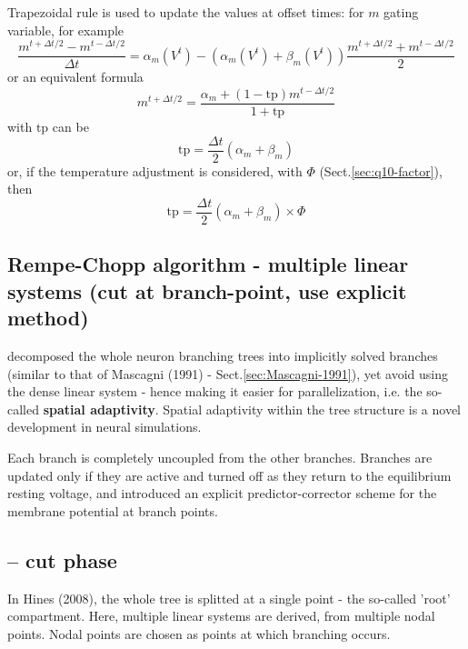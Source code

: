 Trapezoidal rule is used to update the values at offset times: for $m$ gating
variable, for example
\begin{equation}
\frac{m^{t+\Delta t/2} - m^{t-\Delta t/2}}{\Delta t}
= \alpha_m(V^t) - (\alpha_m(V^t) +\beta_m(V^t)) 
\frac{m^{t+\Delta t/2} + m^{t-\Delta t/2}}{2}
\end{equation}
or an equivalent formula
\def\tp{{\text{tp}}}
\begin{equation}
m^{t+\Delta t/2} = \frac{\alpha_m + \left(  1 - \tp \right)m^{t-\Delta
t/2}}{1+\tp}
\end{equation}
with $\tp$ can be
\begin{equation}
\tp = \frac{\Delta t}{2} (\alpha_m + \beta_m)
\end{equation}
or, if the temperature adjustment is considered, with $\Phi$
(Sect.\ref{sec:q10-factor}), then
\begin{equation}
\tp = \frac{\Delta t}{2} (\alpha_m + \beta_m) \times \Phi
\end{equation}



\subsection{Rempe-Chopp algorithm - multiple linear systems (cut at
branch-point, use explicit method)}
\label{sec:Rempe-Chopp}

\citep{rempe2006} decomposed the whole neuron branching trees into implicitly
solved branches (similar to that of Mascagni (1991) -
Sect.\ref{sec:Mascagni-1991}), yet avoid using the dense linear system - hence
making it easier for parallelization, i.e. the so-called {\bf spatial
adaptivity}. Spatial adaptivity within the tree structure is a novel development
in neural simulations.

Each branch is completely uncoupled from the other branches. Branches
are updated only if they are active and turned off as they return to the equilibrium
resting voltage, and introduced an explicit
predictor-corrector scheme for the membrane potential at branch points.

\subsection{-- cut phase}

In Hines (2008), the whole tree is splitted at a single point - the so-called
'root' compartment. Here, multiple linear systems are derived, from multiple
nodal points. Nodal points are chosen as points at which branching occurs.

